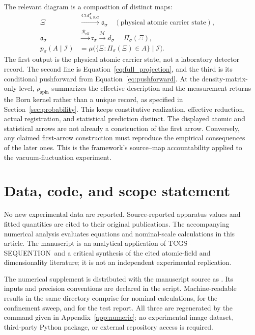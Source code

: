 \documentclass[11pt,a4paper]{article}
\theoremstyle{definition}
\theoremstyle{remark}
\newcommand{\TCGS}{TCGS--SEQUENTION}
\begin{document}
The relevant diagram is a composition of distinct maps:
\begin{equation}
 \begin{aligned}
 \Xi&\xrightarrow{\mathrm{Ctd}^{\sigma}_{4,S,G}}
 \mathfrak a_\sigma\quad(\text{physical atomic carrier state}),\\
 \mathfrak a_\sigma
 &\xrightarrow{\mathcal R_{\mathrm{eff}}}\mathfrak r_\sigma
 \xrightarrow{\mathcal M}d_\sigma=\Pi_\sigma(\Xi),\\
 p_\sigma(A\mid\mathcal I)
 &=\mu\bigl(\{\Xi:\Pi_\sigma(\Xi)\in A\}\mid\mathcal I\bigr).
 \end{aligned}
 \label{eq:closure_chain}
\end{equation}
The first output is the physical atomic carrier state, not a laboratory detector record. The second line is Equation~\eqref{eq:full_projection}, and the third is its conditional pushforward from Equation~\eqref{eq:pushforward}. At the density-matrix-only level, $\rho_{\mathrm{spin}}$ summarizes the effective description and the measurement returns the Born kernel rather than a unique record, as specified in Section~\ref{sec:probability}. This keeps constitutive realization, effective reduction, actual registration, and statistical prediction distinct.\cite{foundation,born}
The displayed atomic and statistical arrows are not already a construction of the first arrow. Conversely, any claimed first-arrow construction must reproduce the empirical consequences of the later ones. This is the framework's source--map accountability applied to the vacuum-fluctuation experiment.\cite{foundation,planck}

\section*{Data, code, and scope statement}
No new experimental data are reported. Source-reported apparatus values and fitted quantities are cited to their original publications. The accompanying numerical analysis evaluates equations and nominal-scale calculations in this article. The manuscript is an analytical application of \TCGS\ and a critical synthesis of the cited atomic-field and dimensionality literature; it is not an independent experimental replication.

The numerical supplement is distributed with the manuscript source as . Its inputs and precision conventions are declared in the script. Machine-readable results in the same  directory comprise  for nominal calculations,  for the confinement sweep, and  for the test report. All three are regenerated by the command given in Appendix~\ref{app:numeric}; no experimental image dataset, third-party Python package, or external repository access is required.
\end{document}
